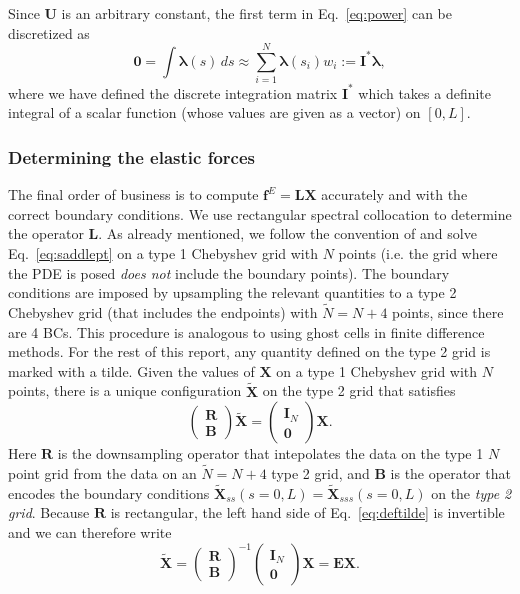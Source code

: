 Since $\bm{U}$ is an arbitrary constant, the first term in Eq.\ \eqref{eq:power} can be discretized as
\begin{equation}
\label{eq:IT}
   \bm{0} = \int \bm{\lambda}(s) \, ds \approx \sum_{i=1}^{N} \bm{\lambda}(s_i) w_i := \bm{I}^*\bm{\lambda},
\end{equation}
where we have defined the discrete integration matrix $\bm{I}^*$ which takes a definite integral of a scalar function (whose values are given as a vector) on $[0,L]$. 
\fi

\subsubsection{Determining the elastic forces}
\label{sec:rsc}
The final order of business is to compute $\bm{f}^E=\bm{LX}$ accurately and with the correct boundary conditions. We use rectangular spectral collocation \cite{tref17, dhale15} to determine the operator $\bm{L}$. As already mentioned, we follow the convention of \cite{dhale15} and solve Eq.\ \eqref{eq:saddlept} on a type 1 Chebyshev grid with $N$ points (i.e. the grid where the PDE is posed \textit{does not} include the boundary points). The boundary conditions are imposed by upsampling the relevant quantities to a type 2 Chebyshev grid (that includes the endpoints) with $\tilde{N}=N+4$ points, since there are 4 BCs. This procedure is analogous to using ghost cells in finite difference methods. For the rest of this report, any quantity defined on the type 2 grid is marked with a tilde. Given the values of $\bm{X}$ on a type 1 Chebyshev grid with $N$ points, there is a unique configuration $\tilde{\bm{X}}$ on the type 2 grid that satisfies
\begin{equation}
\label{eq:deftilde}
\begin{pmatrix} \bm{R} \\[2 pt] \bm{B} \end{pmatrix} \tilde{\bm{X}} = \begin{pmatrix} \bm{I}_N \\[2 pt] \bm{0} \end{pmatrix} \bm{X}. 
\end{equation}
Here $\bm{R}$ is the downsampling operator that intepolates the data on the type 1 $N$ point grid from the data on an $\tilde{N}=N+4$ type 2 grid, and $\bm{B}$ is the operator that encodes the boundary conditions $\displaystyle \tilde{\bm{X}}_{ss}\left(s=0,L\right)=\tilde{\bm{X}}_{sss}\left(s=0,L\right)$ on the \textit{type 2 grid}. Because $\bm{R}$ is rectangular, the left hand side of Eq.\ \eqref{eq:deftilde} is invertible and we can therefore write 
\begin{equation}
\label{eq:getX}
\tilde{\bm{X}} = \begin{pmatrix} \bm{R} \\[2 pt] \bm{B} \end{pmatrix}^{-1} \begin{pmatrix} \bm{I}_N \\[2 pt] \bm{0} \end{pmatrix} \bm{X}= \bm{E}\bm{X}.
\end{equation}

